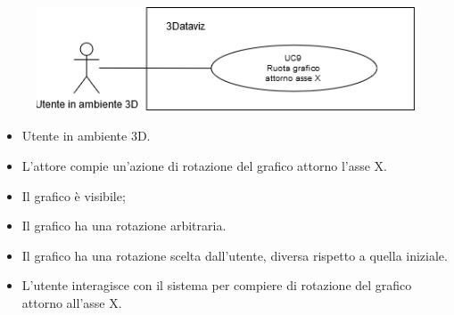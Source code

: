 \begin{figure}[h!]
    \centering
    \includegraphics[scale=0.65]{template/images/UC9.png}
    \caption{}
\end{figure}
\UCdsc
{ %
    \begin{itemize}
        \item Utente in ambiente 3D.
    \end{itemize}
}
{ %
    \begin{itemize}
        \item L'attore compie un'azione di rotazione del grafico attorno l'asse X.
    \end{itemize}
}
{ %
    \begin{itemize}
        \item Il grafico è visibile;
        \item Il grafico ha una rotazione arbitraria.
    \end{itemize}
}
{ %
    \begin{itemize}
        \item Il grafico ha una rotazione scelta dall'utente, diversa rispetto a quella iniziale.
    \end{itemize}
}
{ %
    \begin{itemize}
        \item L'utente interagisce con il sistema per compiere di rotazione del grafico attorno all'asse X.
    \end{itemize}
}

